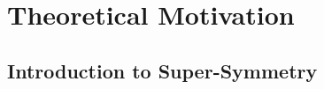
\chapter{Theoretical Motivation}
\label{chap:motivation}
\section{Introduction to Super-Symmetry}
\label{Theory:QFT}
